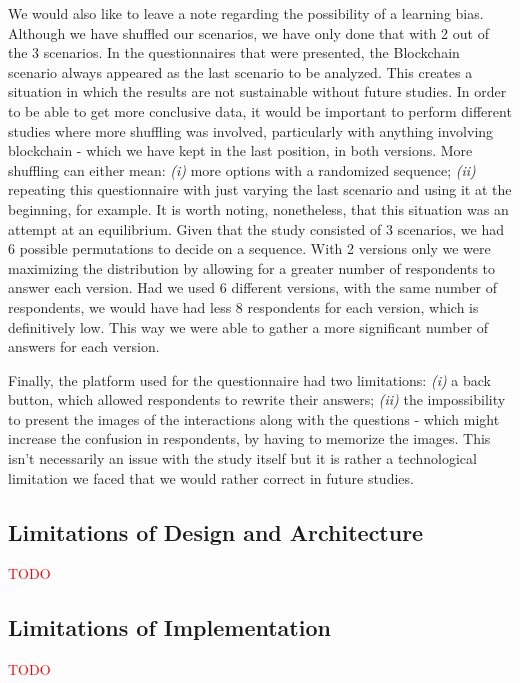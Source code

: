 We would also like to leave a note regarding the possibility of a learning bias. Although we have shuffled our scenarios, we have only done that with 2 out of the 3 scenarios. In the questionnaires that were presented, the Blockchain scenario always appeared as the last scenario to be analyzed. This creates a situation in which the results are not sustainable without future studies. In order to be able to get more conclusive data, it would be important to perform different studies where more shuffling was involved, particularly with anything involving blockchain - which we have kept in the last position, in both versions. More shuffling can either mean: \textit{(i)} more options with a randomized sequence; \textit{(ii)} repeating this questionnaire with just varying the last scenario and using it at the beginning, for example. It is worth noting, nonetheless, that this situation was an attempt at an equilibrium. Given that the study consisted of 3 scenarios, we had 6 possible permutations to decide on a sequence. With 2 versions only we were maximizing the distribution by allowing for a greater number of respondents to answer each version. Had we used 6 different versions, with the same number of respondents, we would have had less 8 respondents for each version, which is definitively low. This way we were able to gather a more significant number of answers for each version.

Finally, the platform used for the questionnaire had two limitations: \textit{(i)} a back button, which allowed respondents to rewrite their answers; \textit{(ii)} the impossibility to present the images of the interactions along with the questions - which might increase the confusion in respondents, by having to memorize the images. This isn't necessarily an issue with the study itself but it is rather a technological limitation we faced that we would rather correct in future studies.

\subsection{Limitations of Design and Architecture}

\textcolor{red}{TODO}

\subsection{Limitations of Implementation}

\textcolor{red}{TODO}